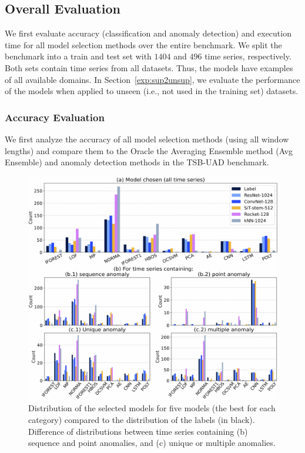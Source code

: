 \subsection{Overall Evaluation}
\label{exp:overalleval}

We first evaluate accuracy (classification and anomaly detection) and execution time for all model selection methods over the entire benchmark. We split the benchmark into a train and test set with $1404$ and $496$ time series, respectively. Both sets contain time series from all datasets. Thus, the models have examples of all available domains. In Section~\ref{exp:sup2unsup}, we evaluate the performance of the models when applied to unseen (i.e., not used in the training set) datasets.

\subsubsection{\textbf{Accuracy Evaluation}}

We first analyze the accuracy of all model selection methods (using all window lengths) and compare them to the Oracle  the Averaging Ensemble method (Avg Ensemble)  and  anomaly detection methods in the TSB-UAD benchmark.

\begin{figure}
    \centering
    \includegraphics[width=\linewidth]{figures/Fig6.jpg}
        \caption{Distribution of the selected models for five models (the best for each category) compared to the distribution of the labels (in black). Difference of distributions between time series containing (b) sequence and point anomalies, and (c) unique or multiple anomalies.}
        \label{fig:classif_distrib}
\end{figure}

